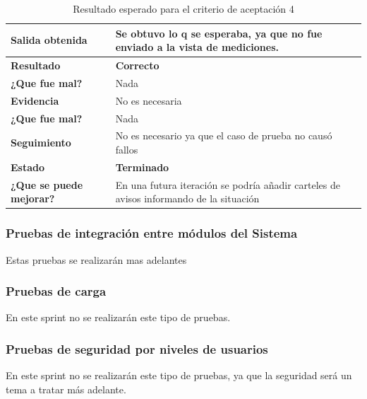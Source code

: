 {\scriptsize
	\begin{table}[h]

	\centering
	\begin{tabular}{|l|p{10cm}|}
	    \hline 
	    \textbf{Salida obtenida}&Se obtuvo lo q se esperaba, ya que no fue enviado a la vista de mediciones.\\ \hline
	    \textbf{Resultado}& \textbf{Correcto}\\ \hline
        \textbf{¿Que fue mal?}& Nada\\ \hline        
        \textbf{Evidencia}&No es necesaria  \\ \hline
        \textbf{¿Que fue mal?}& Nada\\ \hline      
        \textbf{Seguimiento}& No es necesario ya que el caso de prueba no causó fallos \\ \hline
        \textbf{Estado}& \textbf{Terminado}\\ \hline        
        \textbf{¿Que se puede mejorar?}& En una futura iteración se podría añadir carteles de avisos informando de la situación\\ \hline              
	    \end{tabular}
        \caption{Resultado esperado para el criterio de aceptación 4}
   	\end{table}
	}


\clearpage
\subsubsection{Pruebas  de  integración  entre módulos del Sistema}
Estas pruebas se realizarán mas adelantes
\subsubsection{ Pruebas de carga}
En este sprint no se realizarán este tipo de pruebas.
\subsubsection{ Pruebas de seguridad por niveles de usuarios}
En este sprint no se realizarán este tipo de pruebas, ya que la seguridad será un tema a tratar más adelante.

